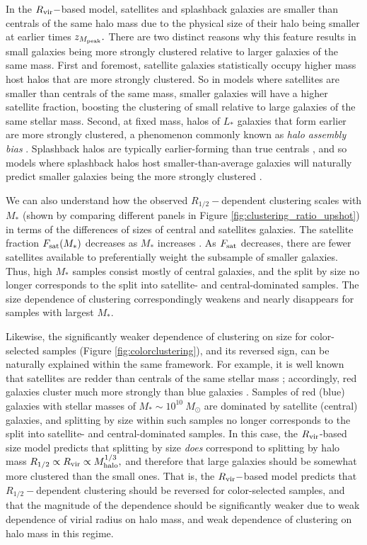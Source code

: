 \documentclass[usenatbib,usegraphicx,letterpaper]{mn2e}
\newcommand{\rhalf}{R_{1/2}}
\newcommand{\mstar}{M_{\ast}}
\newcommand{\zpeak}{z_{M_{\rm peak}}}
\newcommand{\mhalo}{M_{\rm halo}}
\newcommand{\rvir}{R_{\rm vir}}
\begin{document}
In the $\rvir-$based model, satellites and splashback galaxies are smaller than centrals of the same halo mass due to the physical size of their halo being smaller at earlier times $\zpeak.$ There are two distinct reasons why this feature results in small galaxies being more strongly clustered relative to larger galaxies of the same mass. First and foremost, satellite galaxies statistically occupy higher mass host halos that are more strongly clustered. So in models where satellites are smaller than centrals of the same mass, smaller galaxies will have a higher satellite fraction, boosting the clustering of small relative to large galaxies of the same stellar mass. Second, at fixed mass, halos of $L_\ast$ galaxies that form earlier are more strongly clustered, a phenomenon commonly known as {\em halo assembly bias} \citep{gao_white05,wechsler_etal06}. Splashback halos are typically earlier-forming than true centrals \citep{wang_etal09}, and so models where splashback halos host smaller-than-average galaxies will naturally predict smaller galaxies being the more strongly clustered \citep[see][for an example of the splashback-dependence of halo clustering]{sunayama_etal16}.

We can also understand how the observed $\rhalf-$dependent clustering scales with $\mstar$ (shown by comparing different panels in Figure \ref{fig:clustering_ratio_upshot}) in terms of the differences of sizes of central and satellites galaxies. The satellite fraction $F_{\rm sat}(\mstar)$ decreases as $\mstar$ increases \citep[e.g.,][]{guo_etal11,reddick_etal13}. As $F_{\rm sat}$ decreases, there are fewer satellites available to preferentially weight the subsample of smaller galaxies. Thus,  high $\mstar$ samples consist mostly of central galaxies, and the split by size no longer corresponds to the split into satellite- and central-dominated samples. The size dependence of clustering correspondingly weakens and nearly disappears for samples with largest $\mstar$.

Likewise, the significantly weaker dependence of clustering on size for color-selected samples (Figure \ref{fig:colorclustering}), and its reversed sign, can be naturally explained within the same framework.  For example, it is well known that satellites are redder than centrals of the same stellar mass \citep[e.g.,][]{vdB_etal08}; accordingly, red galaxies cluster much more strongly than  blue galaxies \citep[e.g.,][]{zehavi_etal11}. Samples of red (blue) galaxies with stellar masses of $\mstar\sim 10^{10}\ M_\odot$ are dominated by satellite (central) galaxies, and splitting by size within such samples no longer corresponds to the split into satellite- and central-dominated samples. In this case, the $\rvir$-based size model predicts that splitting by size {\em does} correspond to splitting by halo mass $\rhalf\propto\rvir\propto\mhalo^{1/3},$ and therefore that large galaxies should be somewhat more clustered than the small ones. That is, the $\rvir-$based model predicts that $\rhalf-$dependent clustering should be reversed for color-selected samples, and that the magnitude of the dependence should be significantly weaker due to weak dependence of virial radius on halo mass, and weak dependence of clustering on halo mass in this regime.
\end{document}

